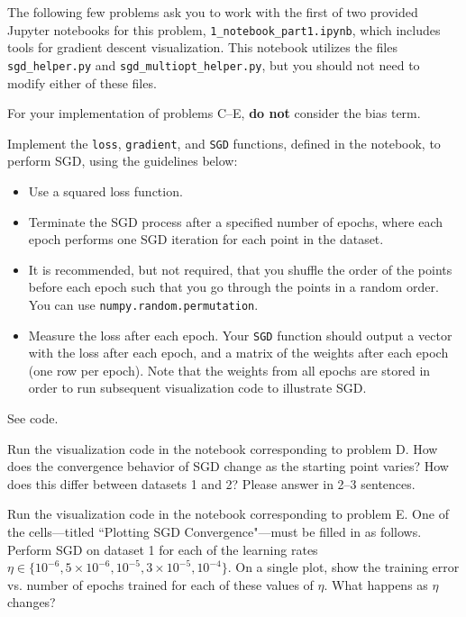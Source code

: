 The following few problems ask you to work with the first of two provided Jupyter notebooks for this problem, \texttt{1_notebook_part1.ipynb}, which includes tools for gradient descent visualization.
This notebook utilizes the files \texttt{sgd_helper.py} and \texttt{sgd_multiopt_helper.py}, but you should not need to modify either of these files.

\newpage

For your implementation of problems C--E, \textbf{do not} consider the bias term.

\begin{problem}[8]
Implement the \texttt{loss}, \texttt{gradient}, and \texttt{SGD} functions, defined in the notebook, to perform SGD, using the guidelines below:

\begin{itemize}
	\item Use a squared loss function.
	\item Terminate the SGD process after a specified number of epochs, where each epoch performs one SGD iteration for each point in the dataset.
	\item It is recommended, but not required, that you shuffle the order of the points before each epoch such that you go through the points in a random order.
	      You can use \texttt{numpy.random.permutation}.
	\item Measure the loss after each epoch.
	      Your \texttt{SGD} function should output a vector with the loss after each epoch, and a matrix of the weights after each epoch (one row per epoch).
	      Note that the weights from all epochs are stored in order to run subsequent visualization code to illustrate SGD.
\end{itemize}
\end{problem}
\begin{solution}
	See code. %
\end{solution}

\begin{problem}[2]
Run the visualization code in the notebook corresponding to problem D.
How does the convergence behavior of SGD change as the starting point varies?
How does this differ between datasets 1 and 2?
Please answer in 2--3 sentences.
\end{problem}
\begin{solution}

\end{solution}

\begin{problem}[6]
Run the visualization code in the notebook corresponding to problem E.
One of the cells---titled ``Plotting SGD Convergence"---must be filled in as follows.
Perform SGD on dataset 1 for each of the learning rates $\eta \in \{10^{-6}, 5\times10^{-6}, 10^{-5}, 3\times 10^{-5}, 10^{-4}\}$.
On a single plot, show the training error vs. number of epochs trained for each of these values of $\eta$.
What happens as $\eta$ changes?
\end{problem}

